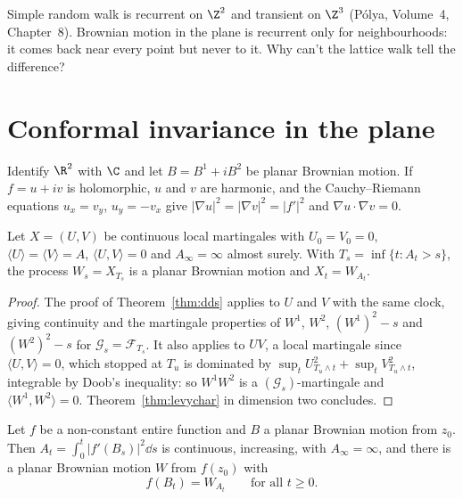 \begin{think}
Simple random walk is recurrent on $\Z^2$ and transient on $\Z^3$ (P\'olya, Volume~4, Chapter~8). Brownian motion in the plane is recurrent only for neighbourhoods: it comes back near every point but never to it. Why
can't the lattice walk tell the difference?
\end{think}

\section{Conformal invariance in the plane}

Identify $\R^2$ with $\C$ and let $B=B^1+iB^2$ be planar Brownian motion. If $f=u+iv$ is holomorphic, $u$ and $v$ are harmonic, and the Cauchy--Riemann equations $u_x=v_y$, $u_y=-v_x$ give
$|\nabla u|^2=|\nabla v|^2=|f'|^2$ and $\nabla u\cdot\nabla v=0$.

\begin{lemma}\label{lem:commonclock}
Let $X=(U,V)$ be continuous local martingales with $U_0=V_0=0$, $\langle U\rangle=\langle V\rangle=A$, $\langle U,V\rangle=0$ and $A_\infty=\infty$ almost surely. With $T_s=\inf\{t:A_t>s\}$, the process $W_s=X_{T_s}$ is a
planar Brownian motion and $X_t=W_{A_t}$.
\end{lemma}

\begin{proof}
The proof of Theorem~\ref{thm:dds} applies to $U$ and $V$ with the same clock, giving continuity and the martingale properties of $W^1$, $W^2$, $(W^1)^2-s$ and $(W^2)^2-s$ for $\mathcal G_s=\mathcal F_{T_s}$. It also applies to
$UV$, a local martingale since $\langle U,V\rangle=0$, which stopped at $T_u$ is dominated by $\sup_tU_{T_u\wedge t}^2+\sup_tV_{T_u\wedge t}^2$, integrable by Doob's inequality: so $W^1W^2$ is a $(\mathcal G_s)$-martingale and
$\langle W^1,W^2\rangle=0$. Theorem~\ref{thm:levychar} in dimension two concludes.
\end{proof}

\begin{theorem}\label{thm:conformal}
Let $f$ be a non-constant entire function and $B$ a planar Brownian motion from $z_0$. Then $A_t=\int_0^t|f'(B_s)|^2\dd s$ is continuous, increasing, with $A_\infty=\infty$, and there is a planar Brownian motion $W$ from $f(z_0)$ with
\[
f(B_t)=W_{A_t}\qquad\text{for all }t\ge0.
\]
\end{theorem}

